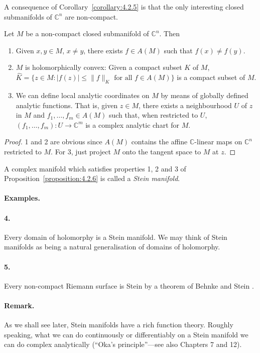 A consequence of Corollary~\ref{corollary:4.2.5} is that the only interesting closed submanifolds of $\mathbb C^n$ are non-compact.

 Let $M$ be a non-compact closed submanifold of $\mathbb C^n$. Then
\begin{enumerate}
\item Given $x,y\in M$, $x\neq y$, there exists $f\in A(M)$ such that $f(x)\neq f(y)$.
\item $M$ is holomorphically convex: Given a compact subset $K$ of $M$, $\widehat K=\{z\in M:|f(z)|\leq\|f\|_K\text{ for all }f\in A(M)\}$ is a compact subset of $M$.
\item We can define local analytic coordinates on $M$ by means of globally defined analytic functions. That is, given $z\in M$, there exists a neighbourhood $U$ of $z$ in $M$ and $f_1,\ldots,f_m\in A(M)$ such that, when restricted to $U$, $(f_1,\ldots,f_m):U\longrightarrow\mathbb C^m$ is a complex analytic chart for $M$.
\end{enumerate}
\begin{proof}
1 and 2 are obvious since $A(M)$ contains the affine $\mathbb C$-linear maps on $\mathbb C^n$ restricted to $M$. For 3, just project $M$ onto the tangent space to $M$ at $z$.
\end{proof}

 A complex manifold which satisfies properties 1, 2 and 3 of Proposition~\ref{proposition:4.2.6} is called a \emph{Stein manifold}.

\paragraph*{Examples.}
\paragraph*{4.} Every domain of holomorphy is a Stein manifold. We may think of Stein manifolds as being a natural generalisation of domains of holomorphy.
\paragraph*{5.} Every non-compact Riemann surface is Stein by a theorem of Behnke and Stein \cite{bib:I:behnke-h-and-stein-k:1}.

\paragraph*{Remark.} As we shall see later, Stein manifolds have a rich function theory. Roughly speaking, what we can do continuously or differentiably on a Stein manifold we can do complex analytically (``Oka's principle''---see also Chapters 7 and 12).

